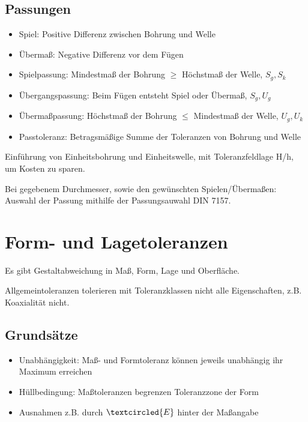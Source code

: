 \documentclass[a4paper,parskip=half*,DIV=7,fontsize=11pt]{scrartcl}
\begin{document}
\subsection{Passungen}
\begin{itemize}
	\item Spiel: Positive Differenz zwischen Bohrung und Welle
	\item Übermaß: Negative Differenz vor dem Fügen
	\item Spielpassung: Mindestmaß der Bohrung $\geq$ Höchstmaß der Welle, $S_g,S_k$
	\item Übergangspassung: Beim Fügen entsteht Spiel oder Übermaß, $S_g,U_g$
	\item Übermaßpassung: Höchstmaß der Bohrung $\leq$ Mindestmaß der Welle, $U_g,U_k$
	\item Passtoleranz: Betragsmäßige Summe der Toleranzen von Bohrung und Welle
\end{itemize}
Einführung von Einheitsbohrung und Einheitswelle, mit Toleranzfeldlage H/h, um Kosten zu sparen. 
	
Bei gegebenem Durchmesser, sowie den gewünschten Spielen/Übermaßen: Auswahl der Passung mithilfe der Passungsauwahl DIN 7157.
	
\section{Form- und Lagetoleranzen}
Es gibt Gestaltabweichung in Maß, Form, Lage und Oberfläche.
	
Allgemeintoleranzen tolerieren mit Toleranzklassen nicht alle Eigenschaften, z.B. Koaxialität nicht.
\subsection{Grundsätze}
\begin{itemize}
	\item Unabhängigkeit: Maß- und Formtoleranz können jeweils unabhängig ihr Maximum erreichen
	\item Hüllbedingung: Maßtoleranzen begrenzen Toleranzzone der Form
	\item Ausnahmen z.B. durch $\textcircled{\tiny E}$ hinter der Maßangabe
\end{itemize}
	
\end{document}
